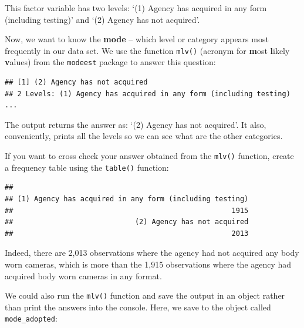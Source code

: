 \documentclass[
]{book}
\newenvironment{Shaded}{\begin{snugshade}}{\end{snugshade}}
\newcommand{\CommentTok}[1]{\textcolor[rgb]{0.56,0.35,0.01}{\textit{#1}}}
\newcommand{\FunctionTok}[1]{\textcolor[rgb]{0.00,0.00,0.00}{#1}}
\newcommand{\NormalTok}[1]{#1}
\newcommand{\SpecialCharTok}[1]{\textcolor[rgb]{0.00,0.00,0.00}{#1}}
\begin{document}
This factor variable has two levels: `(1) Agency has acquired in any form (including testing)' and `(2) Agency has not acquired'.

Now, we want to know the \textbf{mode} -- which level or category appears most frequently in our data set. We use the function \texttt{mlv()} (acronym for \textbf{m}ost \textbf{l}ikely \textbf{v}alues) from the \texttt{modeest} package to answer this question:

\begin{Shaded}
\end{Shaded}

\begin{verbatim}
## [1] (2) Agency has not acquired
## 2 Levels: (1) Agency has acquired in any form (including testing) ...
\end{verbatim}

The output returns the answer as: `(2) Agency has not acquired'. It also, conveniently, prints all the levels so we can see what are the other categories.

If you want to cross check your answer obtained from the \texttt{mlv()} function, create a frequency table using the \texttt{table()} function:

\begin{Shaded}
\end{Shaded}

\begin{verbatim}
## 
## (1) Agency has acquired in any form (including testing) 
##                                                    1915 
##                             (2) Agency has not acquired 
##                                                    2013
\end{verbatim}

Indeed, there are 2,013 observations where the agency had not acquired any body worn cameras, which is more than the 1,915 observations where the agency had acquired body worn cameras in any format.

We could also run the \texttt{mlv()} function and save the output in an object rather than print the answers into the console. Here, we save to the object called \texttt{mode\_adopted}:
\end{document}
